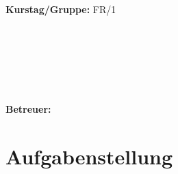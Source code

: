 \documentclass{article}
\begin{document}
\begin{verbatim}


\end{verbatim}
			\begin{flushleft}
			\textbf{\Large{Kurstag/Gruppe:}} \Large{FR/1}
			\end{flushleft}

\begin{verbatim}






\end{verbatim}
			\begin{flushleft}
			\LARGE{\textbf{Betreuer:\Large{ }}}		
			\end{flushleft}
			
\section{Aufgabenstellung}
\end{document}
